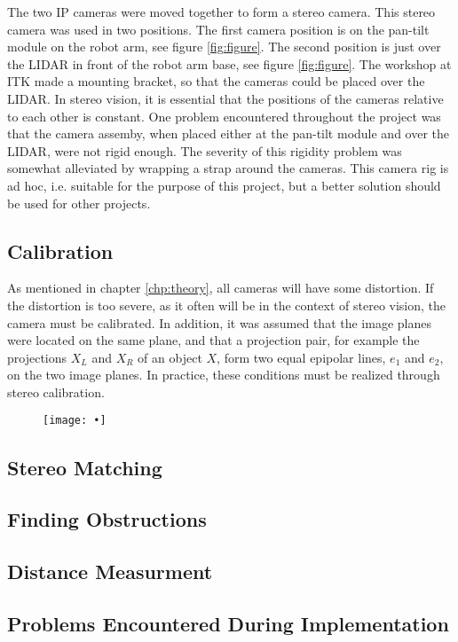The two IP cameras were moved together to form a stereo camera. This stereo camera was used in two positions. The first camera position is on the pan-tilt module on the robot arm, see figure \ref{fig:figure}. The second position is just over the LIDAR in front of the robot arm base, see figure \ref{fig:figure}.  The workshop at ITK made a mounting bracket, so that the cameras could be placed over the LIDAR. In stereo vision, it is essential that the positions of the cameras relative to each other is constant. One problem encountered throughout the project was that the camera assemby, when placed either at the pan-tilt module and over the LIDAR, were not rigid enough. The severity of this rigidity problem was somewhat alleviated by wrapping a strap around the cameras. This camera rig is ad hoc, i.e. suitable for the purpose of this project, but a better solution should be used for other projects.

\subsection{Calibration}

As mentioned in chapter \ref{chp:theory}, all cameras will have some distortion. If the distortion is too severe, as it often will be in the context of stereo vision, the camera must be calibrated. In addition, it was assumed that the image planes were located on the same plane, and that a projection pair, for example the projections $X_L$ and $X_R$ of an object $X$, form two equal epipolar lines, $e_1$ and $e_2$, on the two image planes. In practice, these conditions must be realized through stereo calibration. 

\begin{figure}
\texttt{[image: •]}
\end{figure}

\subsection{Stereo Matching}

\subsection{Finding Obstructions}

\subsection{Distance Measurment}

\subsection{Problems Encountered During Implementation }